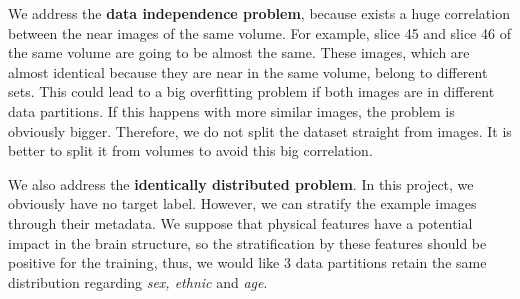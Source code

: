 We address the \textbf{data independence problem}, because exists a huge correlation between the near images of the same volume. For example, slice 45 and slice 46 of the same volume are going to be almost the same. These images, which are almost identical because they are near in the same volume, belong to different sets. This could lead to a big overfitting problem if both images are in different data partitions. If this happens with more similar images, the problem is obviously bigger. Therefore, we do not split the dataset straight from images. It is better to split it from volumes to avoid this big correlation.

We also address the \textbf{identically distributed problem}. In this project, we obviously have no target label. However, we can stratify the example images through their metadata. We suppose that physical features have a potential impact in the brain structure, so the stratification by these features should be positive for the training, thus, we would like 3 data partitions retain the same distribution regarding \textit{sex, ethnic} and \textit{age}.

